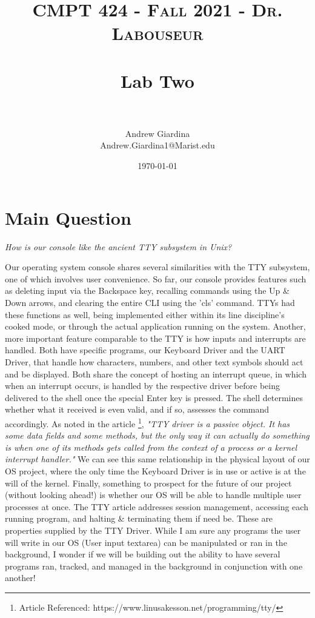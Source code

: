\documentclass[letterpaper, 10pt,DIV=13]{scrartcl}
\title{	
   \normalfont \normalsize 
   \textsc{CMPT 424 - Fall 2021 - Dr. Labouseur} \\[10pt] %
   \horrule{0.5pt} \\[0.25cm] 	%
   \huge Lab Two  \\     	    %
   \horrule{0.5pt} \\[0.25cm] 	%
}
\author{Andrew Giardina \\ \normalsize Andrew.Giardina1@Marist.edu}
\date{\normalsize\today} 	%
\numberwithin{equation}{section} %
\numberwithin{figure}{section} %
\numberwithin{table}{section} %
\begin{document}
\maketitle %

\section*{Main Question}

\textit{How	is	our	console	like	the	ancient	TTY	subsystem	in	Unix?}

Our operating system console shares several similarities with the TTY subsystem, one of which involves user convenience. So far, our console provides features such as deleting input via the Backspace key, recalling commands using the Up \& Down arrows, and clearing the entire CLI using the 'cls' command. TTYs had these functions as well, being implemented either within its line discipline's cooked mode, or through the actual application running on the system. Another, more important feature comparable to the TTY is how inputs and interrupts are handled. Both have specific programs, our Keyboard Driver and the UART Driver, that handle how characters, numbers, and other text symbols should act and be displayed. Both share the concept of hosting an interrupt queue, in which when an interrupt occurs, is handled by the respective driver before being delivered to the shell once the special Enter key is pressed.  The shell determines whether what it received is even valid, and if so, assesses the command accordingly. As noted in the article \footnote{Article Referenced: https://www.linusakesson.net/programming/tty/}, \textit{"TTY driver is a passive object. It has some data fields and some methods, but the only way it can actually do something is when one of its methods gets called from the context of a process or a kernel interrupt handler."} We can see this same relationship in the physical layout of our OS project, where the only time the Keyboard Driver is in use or active is at the will of the kernel. Finally, something to prospect for the future of our project (without looking ahead!) is whether our OS will be able to handle multiple user processes at once.  The TTY article addresses session management, accessing each running program, and halting \& terminating them if need be. These are properties supplied by the TTY Driver. While I am sure any programs the user will write in our OS (User input textarea) can be manipulated or ran in the background, I wonder if we will be building out the ability to have several programs ran, tracked, and managed in the background in conjunction with one another!  
\end{document}
